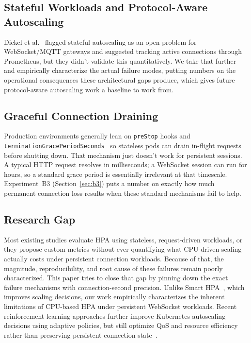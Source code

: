 \documentclass[twocolumn]{svjour3}
\begin{document}
\subsection{Stateful Workloads and Protocol-Aware Autoscaling}

Dickel et al.~\cite{dickel2019evaluation} flagged stateful autoscaling as an open
problem for WebSocket/MQTT gateways and suggested tracking active connections
through Prometheus, but they didn't validate this quantitatively. We take that
further and empirically characterize the actual failure modes, putting numbers on
the operational consequences these architectural gaps produce, which gives future
protocol-aware autoscaling work a baseline to work from.

\subsection{Graceful Connection Draining}

Production environments generally lean on \texttt{preStop} hooks and
\texttt{terminationGracePeriodSeconds}~\cite{k8s_container_lifecycle_hooks} so
stateless pods can drain in-flight requests before shutting down. That mechanism
just doesn't work for persistent sessions. A typical HTTP request resolves in
milliseconds; a WebSocket session can run for hours, so a standard grace period is
essentially irrelevant at that timescale. Experiment~B3 (Section~\ref{sec:b3})
puts a number on exactly how much permanent connection loss results when these
standard mechanisms fail to help.

\subsection{Research Gap}

Most existing studies evaluate HPA using stateless, request-driven workloads, or
they propose custom metrics without ever quantifying what CPU-driven scaling
actually costs under persistent connection workloads. Because of that, the
magnitude, reproducibility, and root cause of these failures remain poorly
characterized. This paper tries to close that gap by pinning down the exact
failure mechanisms with connection-second precision. Unlike Smart HPA~\cite{ahmad2024smarthpa}, which improves scaling decisions, our work empirically characterizes the inherent limitations of CPU-based HPA under persistent WebSocket workloads. Recent reinforcement learning approaches further improve Kubernetes autoscaling decisions using adaptive policies, but still optimize QoS and resource efficiency rather than preserving persistent connection state~\cite{khaleq2023intelligent}.
\end{document}
